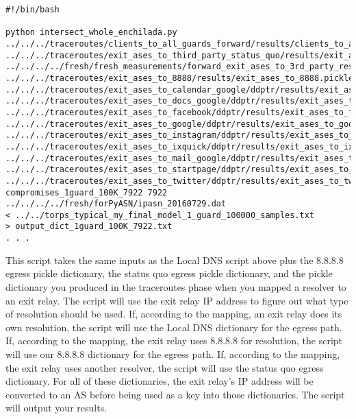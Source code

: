 \documentclass{article}
\begin{document}
\begin{lstlisting}[basicstyle=\scriptsize\ttfamily]
#!/bin/bash

python intersect_whole_enchilada.py 
../../../traceroutes/clients_to_all_guards_forward/results/clients_to_all_guards_forward_dict.pickle 
../../../traceroutes/exit_ases_to_third_party_status_quo/results/exit_ases_to_third_party.pickle 
../../../../fresh/fresh_measurements/forward_exit_ases_to_3rd_party_resolvers/final_exit_ip_to_one_resolver_list_dict.pickle 
../../../traceroutes/exit_ases_to_8888/results/exit_ases_to_8888.pickle 
../../../traceroutes/exit_ases_to_calendar_google/ddptr/results/exit_ases_to_calendar_google_ddptr.pickle 
../../../traceroutes/exit_ases_to_docs_google/ddptr/results/exit_ases_to_docs_google_ddptr.pickle 
../../../traceroutes/exit_ases_to_facebook/ddptr/results/exit_ases_to_facebook_ddptr.pickle 
../../../traceroutes/exit_ases_to_google/ddptr/results/exit_ases_to_google_ddptr.pickle 
../../../traceroutes/exit_ases_to_instagram/ddptr/results/exit_ases_to_instagram_ddptr.pickle 
../../../traceroutes/exit_ases_to_ixquick/ddptr/results/exit_ases_to_ixquick_ddptr.pickle 
../../../traceroutes/exit_ases_to_mail_google/ddptr/results/exit_ases_to_mail_google_ddptr.pickle 
../../../traceroutes/exit_ases_to_startpage/ddptr/results/exit_ases_to_startpage_ddptr.pickle 
../../../traceroutes/exit_ases_to_twitter/ddptr/results/exit_ases_to_twitter_ddptr.pickle 
compromises_1guard_100K_7922 7922 ../../../../fresh/forPyASN/ipasn_20160729.dat 
< ../../torps_typical_my_final_model_1_guard_100000_samples.txt 
> output_dict_1guard_100K_7922.txt
. . .
\end{lstlisting}
This script 
takes the same inputs as the Local DNS script above plus the 8.8.8.8 egress 
pickle dictionary, the status quo egress pickle dictionary, and the pickle 
dictionary you produced in the traceroutes phase when you mapped a resolver to an 
exit relay. The script will use the exit relay IP address to figure out what type of 
resolution should be used. If, according to the mapping, an exit relay does its own 
resolution, the script will use the Local DNS dictionary for the egress path. If, 
according to the mapping, the exit relay uses 8.8.8.8 for resolution, the script will 
use our 8.8.8.8 dictionary for the egress path. If, according to the mapping, the exit 
relay uses another resolver, the script will use the status quo egress dictionary. For 
all of these dictionaries, the exit relay's IP address will be converted to an AS before 
being used as a key into those dictionaries. The script will output your results.
\end{document}
